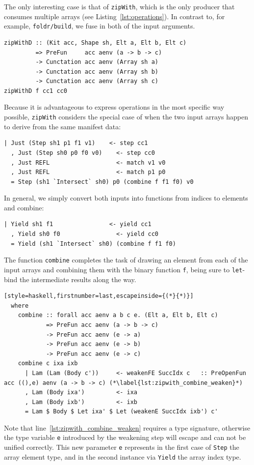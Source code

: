 The only interesting case is that of \texttt{zipWith}, which is the only
producer that consumes multiple arrays (see Listing~\ref{lst:operations}). In
contrast to, for example, \texttt{foldr/build}, we
fuse in both of the input arguments.
%
\begin{lstlisting}[style=haskell]
zipWithD :: (Kit acc, Shape sh, Elt a, Elt b, Elt c)
         => PreFun     acc aenv (a -> b -> c)
         -> Cunctation acc aenv (Array sh a)
         -> Cunctation acc aenv (Array sh b)
         -> Cunctation acc aenv (Array sh c)
zipWithD f cc1 cc0
\end{lstlisting}
%
Because it is advantageous to express operations in the most specific way
possible, \texttt{zipWith} considers the special case of when the two input
arrays happen to derive from the same manifest data:
%
\begin{lstlisting}[style=haskell,firstnumber=last]
  | Just (Step sh1 p1 f1 v1)    <- step cc1
  , Just (Step sh0 p0 f0 v0)    <- step cc0
  , Just REFL                   <- match v1 v0
  , Just REFL                   <- match p1 p0
  = Step (sh1 `Intersect` sh0) p0 (combine f f1 f0) v0
\end{lstlisting}
%
In general, we simply convert both inputs into functions from indices to
elements and combine:
%
\begin{lstlisting}[style=haskell,firstnumber=last]
  | Yield sh1 f1                <- yield cc1
  , Yield sh0 f0                <- yield cc0
  = Yield (sh1 `Intersect` sh0) (combine f f1 f0)
\end{lstlisting}
%
The function \texttt{combine} completes the task of drawing an element from each
of the input arrays and combining them with the binary function \texttt{f},
being sure to \texttt{let}-bind the intermediate results along the way.
%
\begin{lstlisting}[style=haskell,firstnumber=last,escapeinside={(*}{*)}]
  where
    combine :: forall acc aenv a b c e. (Elt a, Elt b, Elt c)
            => PreFun acc aenv (a -> b -> c)
            -> PreFun acc aenv (e -> a)
            -> PreFun acc aenv (e -> b)
            -> PreFun acc aenv (e -> c)
    combine c ixa ixb
      | Lam (Lam (Body c'))     <- weakenFE SuccIdx c   :: PreOpenFun acc ((),e) aenv (a -> b -> c) (*\label{lst:zipwith_combine_weaken}*)
      , Lam (Body ixa')         <- ixa
      , Lam (Body ixb')         <- ixb
      = Lam $ Body $ Let ixa' $ Let (weakenE SuccIdx ixb') c'
\end{lstlisting}
%
Note that line~\ref{lst:zipwith_combine_weaken} requires a type signature,
otherwise the type variable \texttt{e} introduced by the weakening step will
escape and can not be unified correctly. This new parameter \texttt{e}
represents in the first case of \texttt{Step} the array element type, and in the
second instance via \texttt{Yield} the array index type.


